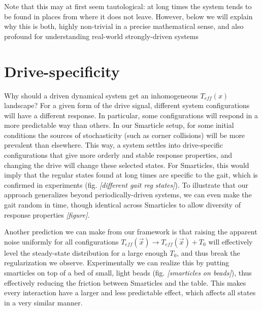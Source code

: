 \documentclass[11pt]{article}
\renewcommand{\v}[1]{\ensuremath{\vec{#1}}} %
\renewcommand{\=}[1]{\stackrel{#1}{=}} %
\renewcommand{\(}{\left (}
\renewcommand{\)}{\right  )}
\renewcommand{\[}{\left [}
\renewcommand{\]}{\right ]}
\newcommand{\<}{\left <}
\renewcommand{\>}{\right >}
\theoremstyle{definition}
\theoremstyle{remark}
\renewcommand{\todo}[1]{\textit{\color{red}[#1]}}
\begin{document}
Note that this may at first seem tautological: at long times the system tends to be found in places from where it does not leave. However, below we will explain why this is both, highly non-trivial in a precise mathematical sense, and also profound for understanding real-world strongly-driven systems 

\section{Drive-specificity}
Why should a driven dynamical system get an inhomogeneous $ T_{eff}(x) $ landscape? For a given form of the drive signal, different system configurations will have a different response. In particular, some configurations will respond in a more predictable way than others. In our Smarticle setup, for some initial conditions the sources of stochasticity (such as corner collisions) will be more prevalent than elsewhere. This way, a system settles into drive-specific configurations that give more orderly and stable response properties, and changing the drive will change these selected states. For Smarticles, this would imply that the regular states found at long times are specific to the gait, which is confirmed in experiments (fig. \todo{different gait reg states}). To illustrate that our approach generalizes beyond periodically-driven systems, we can even make the gait random in time, though identical across Smarticles to allow diversity of response properties \todo{figure}.

Another prediction we can make from our framework is that raising the apparent noise uniformly for all configurations $ T_{eff}(\v{x}) \rightarrow T_{eff}(\v{x})+T_0$ will effectively level the steady-state distribution for a large enough $ T_0 $, and thus break the regularization we observe. Experimentally we can realize this by putting smarticles on top of a bed of small, light beads (fig. \todo{smarticles on beads}), thus effectively reducing the friction between Smarticles and the table. This makes every interaction have a larger and less predictable effect, which affects all states in a very similar manner.

\end{document}
